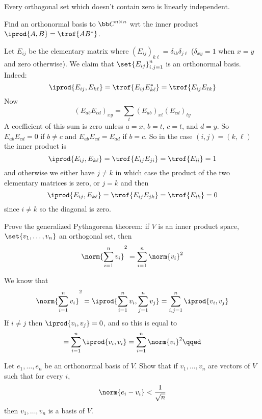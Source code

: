 \edefn

\bthrm

    Every orthogonal set which doesn't contain zero is linearly independent.

\ethrm

\bexerc

    Find an orthonormal basis to ${\bb C}^{n\times n}$ wrt the inner product $\iprod{A,B}=\trof{AB^*}$.

\eexerc

Let $E_{ij}$ be the elementary matrix where $(E_{ij})_{k\ell}=\delta_{ik}\delta_{j\ell}$ ($\delta_{xy}=1$ when $x=y$ and zero otherwise).
We claim that $\set{E_{ij}}_{i,j=1}^n$ is an orthonormal basis.
Indeed:
$$ \iprod{E_{ij},E_{k\ell}} = \trof{E_{ij}E_{k\ell}^*} = \trof{E_{ij}E_{\ell k}} $$
Now
$$ (E_{ab}E_{cd})_{xy} = \sum_t (E_{ab})_{xt}(E_{cd})_{ty} $$
A coefficient of this sum is zero unless $a=x$, $b=t$, $c=t$, and $d=y$.
So $E_{ab}E_{cd}=0$ if $b\neq c$ and $E_{ab}E_{cd}=E_{ad}$ if $b=c$.
So in the case $(i,j)=(k,\ell)$ the inner product is
$$ \iprod{E_{ij},E_{k\ell}} = \trof{E_{ij}E_{ji}} = \trof{E_{ii}} = 1 $$
and otherwise we either have $j\neq k$ in which case the product of the two elementary matrices is zero, or $j=k$ and then
$$ \iprod{E_{ij},E_{k\ell}} = \trof{E_{ij}E_{jk}} = \trof{E_{ik}} = 0 $$
since $i\neq k$ so the diagonal is zero.
\qqed

\bexerc

    Prove the generalized Pythagorean theorem: if $V$ is an inner product space, $\set{v_1,\dots,v_n}$ an orthogonal set, then
    $$ \norm{\sum_{i=1}^nv_i}^2 = \sum_{i=1}^n\norm{v_i}^2 $$

\eexerc

We know that
$$ \norm{\sum_{i=1}^nv_i}^2 = \iprod{\sum_{i=1}^nv_i,\sum_{j=1}^nv_j} = \sum_{i,j=1}^n\iprod{v_i,v_j} $$
If $i\neq j$ then $\iprod{v_i,v_j}=0$, and so this is equal to
$$ = \sum_{i=1}^n\iprod{v_i,v_i} = \sum_{i=1}^n\norm{v_i}^2 \qqed $$

\bexerc

    Let $e_1,\dots,e_n$ be an orthonormal basis of $V$.
    Show that if $v_1,\dots,v_n$ are vectors of $V$ such that for every $i$,
    $$ \norm{e_i-v_i} < \frac1{\sqrt n} $$
    then $v_1,\dots,v_n$ is a basis of $V$.

\eexerc

